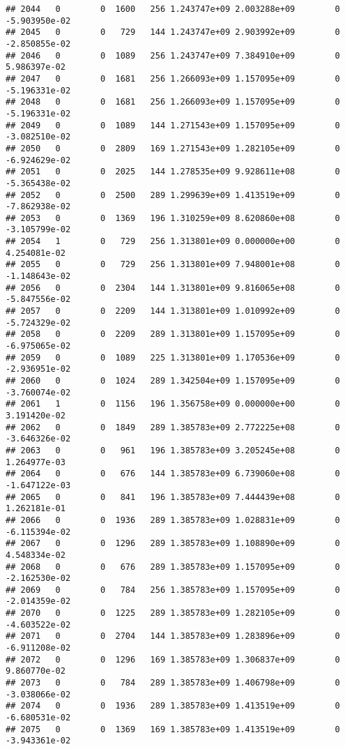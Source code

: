\documentclass[
]{article}
\begin{document}
\begin{enumerate}
\begin{verbatim}
## 2044   0        0  1600   256 1.243747e+09 2.003288e+09        0 -5.903950e-02
## 2045   0        0   729   144 1.243747e+09 2.903992e+09        0 -2.850855e-02
## 2046   0        0  1089   256 1.243747e+09 7.384910e+09        0  5.986397e-02
## 2047   0        0  1681   256 1.266093e+09 1.157095e+09        0 -5.196331e-02
## 2048   0        0  1681   256 1.266093e+09 1.157095e+09        0 -5.196331e-02
## 2049   0        0  1089   144 1.271543e+09 1.157095e+09        0 -3.082510e-02
## 2050   0        0  2809   169 1.271543e+09 1.282105e+09        0 -6.924629e-02
## 2051   0        0  2025   144 1.278535e+09 9.928611e+08        0 -5.365438e-02
## 2052   0        0  2500   289 1.299639e+09 1.413519e+09        0 -7.862938e-02
## 2053   0        0  1369   196 1.310259e+09 8.620860e+08        0 -3.105799e-02
## 2054   1        0   729   256 1.313801e+09 0.000000e+00        0  4.254081e-02
## 2055   0        0   729   256 1.313801e+09 7.948001e+08        0 -1.148643e-02
## 2056   0        0  2304   144 1.313801e+09 9.816065e+08        0 -5.847556e-02
## 2057   0        0  2209   144 1.313801e+09 1.010992e+09        0 -5.724329e-02
## 2058   0        0  2209   289 1.313801e+09 1.157095e+09        0 -6.975065e-02
## 2059   0        0  1089   225 1.313801e+09 1.170536e+09        0 -2.936951e-02
## 2060   0        0  1024   289 1.342504e+09 1.157095e+09        0 -3.760074e-02
## 2061   1        0  1156   196 1.356758e+09 0.000000e+00        0  3.191420e-02
## 2062   0        0  1849   289 1.385783e+09 2.772225e+08        0 -3.646326e-02
## 2063   0        0   961   196 1.385783e+09 3.205245e+08        0  1.264977e-03
## 2064   0        0   676   144 1.385783e+09 6.739060e+08        0 -1.647122e-03
## 2065   0        0   841   196 1.385783e+09 7.444439e+08        0  1.262181e-01
## 2066   0        0  1936   289 1.385783e+09 1.028831e+09        0 -6.115394e-02
## 2067   0        0  1296   289 1.385783e+09 1.108890e+09        0  4.548334e-02
## 2068   0        0   676   289 1.385783e+09 1.157095e+09        0 -2.162530e-02
## 2069   0        0   784   256 1.385783e+09 1.157095e+09        0 -2.014359e-02
## 2070   0        0  1225   289 1.385783e+09 1.282105e+09        0 -4.603522e-02
## 2071   0        0  2704   144 1.385783e+09 1.283896e+09        0 -6.911208e-02
## 2072   0        0  1296   169 1.385783e+09 1.306837e+09        0  9.860770e-02
## 2073   0        0   784   289 1.385783e+09 1.406798e+09        0 -3.038066e-02
## 2074   0        0  1936   289 1.385783e+09 1.413519e+09        0 -6.680531e-02
## 2075   0        0  1369   169 1.385783e+09 1.413519e+09        0 -3.943361e-02

\end{verbatim}
\end{enumerate}
\end{document}
